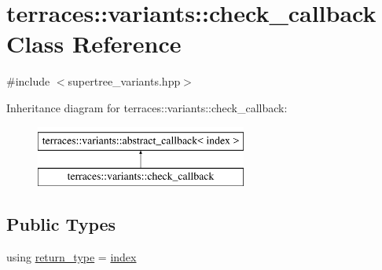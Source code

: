 \hypertarget{classterraces_1_1variants_1_1check__callback}{}\section{terraces\+:\+:variants\+:\+:check\+\_\+callback Class Reference}
\label{classterraces_1_1variants_1_1check__callback}


{\ttfamily \#include $<$supertree\+\_\+variants.\+hpp$>$}

Inheritance diagram for terraces\+:\+:variants\+:\+:check\+\_\+callback\+:\begin{figure}[H]
\begin{center}
\leavevmode
\includegraphics[height=2.000000cm]{classterraces_1_1variants_1_1check__callback}
\end{center}
\end{figure}
\subsection*{Public Types}
\begin{DoxyCompactItemize}
\item 
using \hyperlink{classterraces_1_1variants_1_1check__callback_ab5d02c5889d54c20a3e74d104aab9893}{return\+\_\+type} = \hyperlink{namespaceterraces_adbc33ccb543d1634e96d0eb02e472c77}{index}
\end{DoxyCompactItemize}
